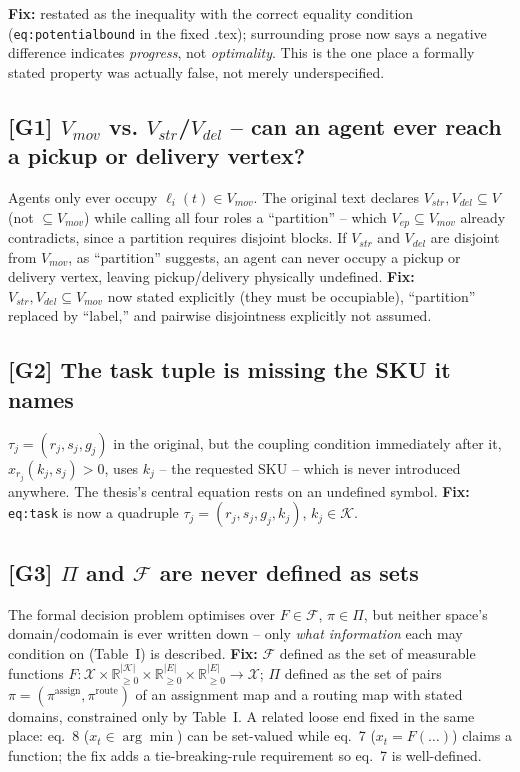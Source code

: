 \documentclass[11pt]{article}
\begin{document}
\textbf{Fix:} restated as the inequality with the correct equality condition
(\texttt{eq:potentialbound} in the fixed .tex); surrounding prose now says a
negative difference indicates \emph{progress}, not \emph{optimality}. This is
the one place a formally stated property was actually false, not merely
underspecified.

\subsection*{[G1] \texorpdfstring{$V_{mov}$}{Vmov} vs. \texorpdfstring{$V_{str}$}{Vstr}/\texorpdfstring{$V_{del}$}{Vdel} -- can an agent ever reach a pickup or delivery vertex?}
Agents only ever occupy $\ell_i(t) \in V_{mov}$. The original text declares
$V_{str}, V_{del} \subseteq V$ (not $\subseteq V_{mov}$) while calling all
four roles a ``partition'' -- which $V_{ep}\subseteq V_{mov}$ already
contradicts, since a partition requires disjoint blocks. If $V_{str}$ and
$V_{del}$ are disjoint from $V_{mov}$, as ``partition'' suggests, an agent can
never occupy a pickup or delivery vertex, leaving pickup/delivery physically
undefined. \textbf{Fix:} $V_{str}, V_{del} \subseteq V_{mov}$ now stated
explicitly (they must be occupiable), ``partition'' replaced by ``label,''
and pairwise disjointness explicitly not assumed.

\subsection*{[G2] The task tuple is missing the SKU it names}
$\tau_j = (r_j, s_j, g_j)$ in the original, but the coupling condition
immediately after it, $x_{r_j}(k_j, s_j) > 0$, uses $k_j$ -- the requested
SKU -- which is never introduced anywhere. The thesis's central equation
rests on an undefined symbol. \textbf{Fix:} \texttt{eq:task} is now a
quadruple $\tau_j = (r_j, s_j, g_j, k_j)$, $k_j \in \mathcal{K}$.

\subsection*{[G3] \texorpdfstring{$\Pi$}{Pi} and \texorpdfstring{$\mathcal{F}$}{F} are never defined as sets}
The formal decision problem optimises over $F \in \mathcal{F}$, $\pi \in
\Pi$, but neither space's domain/codomain is ever written down -- only
\emph{what information} each may condition on (Table~I) is described.
\textbf{Fix:} $\mathcal{F}$ defined as the set of measurable functions
$F : \mathcal{X} \times \mathbb{R}_{\ge0}^{|\mathcal{K}|} \times
\mathbb{R}_{\ge0}^{|E|} \times \mathbb{R}_{\ge0}^{|E|} \to \mathcal{X}$;
$\Pi$ defined as the set of pairs $\pi=(\pi^{\text{assign}},
\pi^{\text{route}})$ of an assignment map and a routing map with stated
domains, constrained only by Table~I. A related loose end fixed in the same
place: eq.~8 ($x_t \in \arg\min$) can be set-valued while eq.~7 ($x_t =
F(\ldots)$) claims a function; the fix adds a tie-breaking-rule requirement
so eq.~7 is well-defined.
\end{document}
